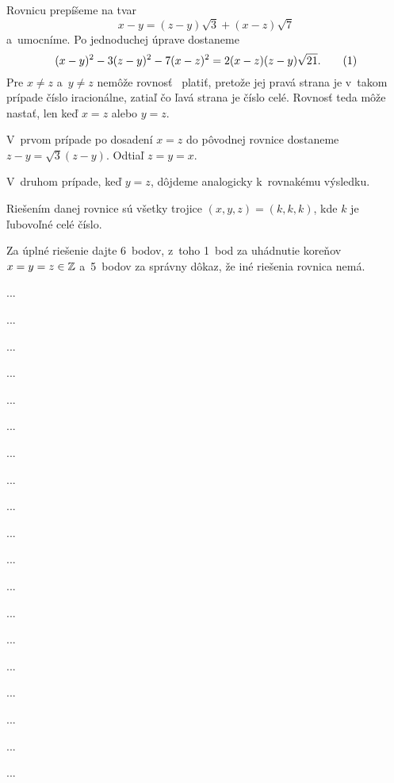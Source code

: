 {%
Rovnicu prepíšeme na tvar
$$
  x-y = (z-y)\sqrt3 + (x-z)\sqrt7
$$
a~umocníme. Po jednoduchej úprave dostaneme
$$
  (x-y)^2 - 3(z-y)^2 - 7(x-z)^2 = 2(x-z)(z-y)\sqrt{21}. \tag1
$$
Pre $x\ne z$ a~$y\ne z$ nemôže rovnosť~ platiť, pretože jej pravá strana
je v~takom prípade
číslo iracionálne, zatiaľ čo ľavá strana je číslo celé. Rovnosť teda môže nastať,
len keď $x=z$ alebo $y=z$.

V~prvom prípade po dosadení $x=z$ do pôvodnej rovnice dostaneme
$z-y=\sqrt3(z-y)$. Odtiaľ $z=y=x$.

V~druhom prípade, keď $y=z$, dôjdeme analogicky k~rovnakému výsledku.

\zaver
Riešením danej rovnice sú všetky trojice $(x,y,z)=(k,k,k)$, kde $k$ je ľubovoľné
celé číslo.

\nobreak\medskip\petit\noindent
Za úplné riešenie dajte 6~bodov,
z~toho 1~bod za uhádnutie
koreňov $x=y=z\in\Bbb Z$
a~5~bodov za správny dôkaz, že iné riešenia rovnica nemá.
\endpetit
\bigbreak}

{%
...}

{%
...}

{%
...}

{%
...}

{%
...}

{%
...}

{%
...}

{%
...}

{%
...}

{%
...}

{%
...}

{%
...}

{%
...}

{%
...}

{%
...}

{%
...}

{%
...}

{%
...}

{%
...}

